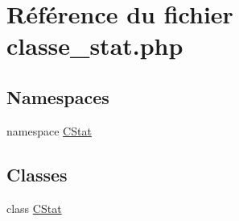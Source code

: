 \hypertarget{classe__stat_8php}{
\section{R\'{e}f\'{e}rence du fichier classe\_\-stat.php}
\label{classe__stat_8php}
}
\subsection*{Namespaces}
\begin{CompactItemize}
\item 
namespace \hyperlink{namespaceCStat}{CStat}
\end{CompactItemize}
\subsection*{Classes}
\begin{CompactItemize}
\item 
class \hyperlink{classCStat}{CStat}
\end{CompactItemize}
